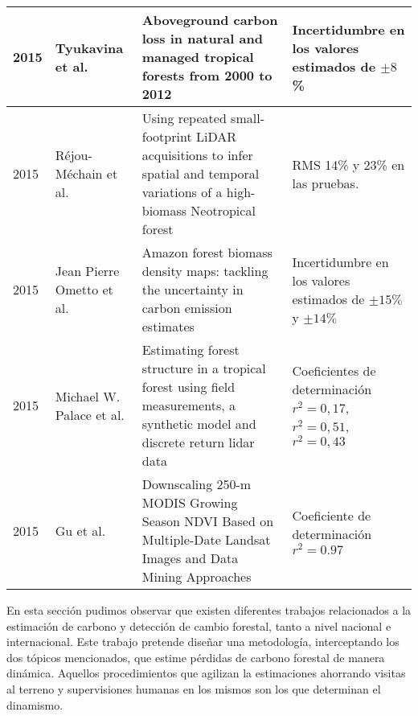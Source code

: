 \begin{longtable}{|p{3cm}|p{3cm}|p{3cm}|p{3cm}|}
				2015          & Tyukavina et al.                                       & Aboveground carbon loss in natural and managed tropical 	forests from 2000 to 2012                                                                                      & Incertidumbre en los valores estimados de $ \pm 8 $\%                                     \\ \hline
				2015          & R\'ejou-M\'echain et al.                       & Using repeated small-footprint LiDAR acquisitions to infer spatial and temporal variations of a high-biomass Neotropical forest                                        & RMS 14\% y 23\% en las pruebas.                                                          \\ \hline
				2015          & Jean Pierre Ometto et al.                              & Amazon forest biomass density maps: tackling the uncertainty in carbon emission estimates                                                                              & Incertidumbre en los valores estimados de $ \pm 15\% $ y $ \pm 14\% $                     \\ \hline
				2015          & Michael W. Palace et al.                               & Estimating forest structure in a tropical forest using field measurements, a synthetic model and discrete return lidar data                                            & Coeficientes de determinaci\'on $ r^{2}=0,17 $, $ r^{2}=0,51 $, $ r^{2}=0,43 $            \\ \hline
				2015          & Gu et al.                                         & Downscaling 250-m MODIS Growing Season NDVI Based on Multiple-Date Landsat Images and Data Mining Approaches                                                           & Coeficiente de determinaci\'on $ r^{2}=0.97 $                                             \\ \hline		 

	\end{longtable}


En esta secci\'on pudimos observar que existen diferentes trabajos relacionados a la estimaci\'on de carbono y detecci\'on de cambio forestal, tanto a nivel nacional e internacional. Este trabajo pretende dise\~{n}ar una metodolog\'ia, interceptando los dos t\'opicos mencionados, que estime p\'erdidas de carbono forestal de manera din\'amica. Aquellos procedimientos que agilizan la estimaciones ahorrando visitas al terreno y supervisiones humanas en los mismos son los que determinan el dinamismo.


